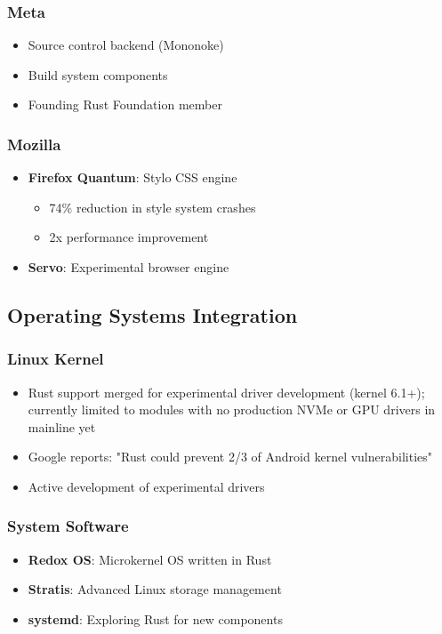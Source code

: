 \documentclass[11pt]{article}
\begin{document}
\subsubsection{Meta}
\begin{itemize}
    \item Source control backend (Mononoke)
    \item Build system components
    \item Founding Rust Foundation member
\end{itemize}

\subsubsection{Mozilla}
\begin{itemize}
    \item \textbf{Firefox Quantum}: Stylo CSS engine
    \begin{itemize}
        \item 74\% reduction in style system crashes~\cite{mozilla2017quantum}
        \item 2x performance improvement
    \end{itemize}
    \item \textbf{Servo}: Experimental browser engine
\end{itemize}

\subsection{Operating Systems Integration}

\subsubsection{Linux Kernel}
\begin{itemize}
    \item Rust support merged for experimental driver development (kernel 6.1+); currently limited to modules with no production NVMe or GPU drivers in mainline yet
    \item Google reports: "Rust could prevent 2/3 of Android kernel vulnerabilities"~\cite{google2023kernel}
    \item Active development of experimental drivers
\end{itemize}

\subsubsection{System Software}
\begin{itemize}
    \item \textbf{Redox OS}: Microkernel OS written in Rust
    \item \textbf{Stratis}: Advanced Linux storage management
    \item \textbf{systemd}: Exploring Rust for new components
\end{itemize}
\end{document}
